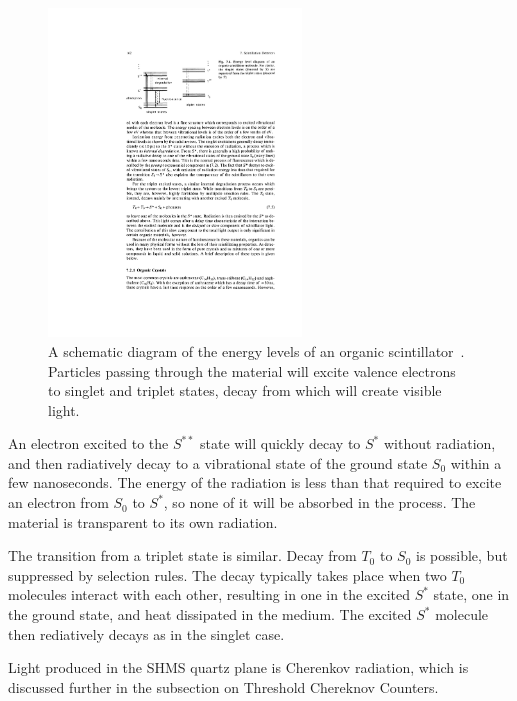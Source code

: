 \begin{figure}[!h]
    \centering
    \includegraphics[width=0.6\textwidth]{chap3/leo_scintillator_energy_levels.pdf}
    \caption{A schematic diagram of the energy levels of an organic
             scintillator~\cite{Leo_1994}. Particles passing through the
             material will excite valence electrons to singlet and triplet
             states, decay from which will create visible light.}
    \label{fig:leo_scintillator_energy_levels}
\end{figure}

An electron excited to the $S^{**}$ state will quickly decay to $S^*$ without
radiation, and then radiatively decay to a vibrational state of the ground
state $S_0$ within a few nanoseconds.
The energy of the radiation is less than that required to excite an electron
from $S_0$ to $S^*$, so none of it will be absorbed in the process.
The material is transparent to its own radiation.

The transition from a triplet state is similar.
Decay from $T_0$ to $S_0$ is possible, but suppressed by selection rules.
The decay typically takes place when two $T_0$ molecules interact with each
other, resulting in one in the excited $S^*$ state, one in the ground state,
and heat dissipated in the medium. The excited $S^*$ molecule then rediatively
decays as in the singlet case.

Light produced in the SHMS quartz plane is Cherenkov radiation, which is
discussed further in the subsection on Threshold Chereknov Counters.

